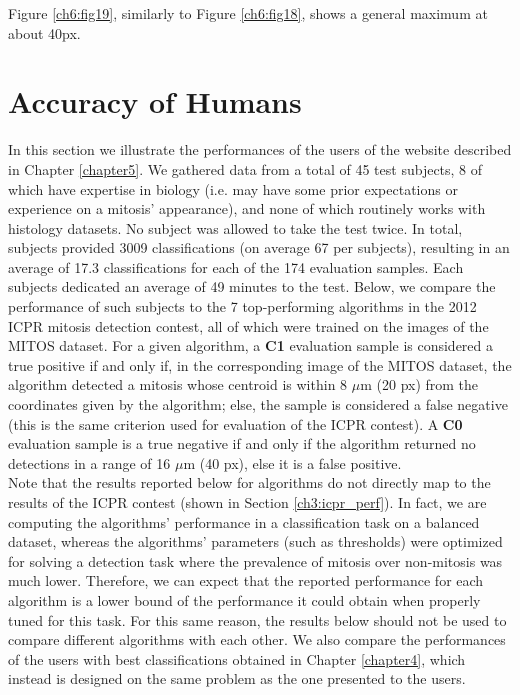 Figure \ref{ch6:fig19}, similarly to Figure \ref{ch6:fig18}, shows a general maximum at about 40px.


\vspace{0.5cm}

\clearpage

\section{Accuracy of Humans}

In this section we illustrate the performances of the users of the website described in Chapter \ref{chapter5}.
We gathered data from a total of 45 test subjects, 8 of which have expertise in biology (i.e. may have some prior expectations or experience on a mitosis’ appearance),
and none of which routinely works with histology datasets. No subject was allowed to take the test twice. In total, subjects provided 3009 classifications
(on average 67 per subjects), resulting in an average of 17.3 classifications for each of the 174 evaluation samples.
Each subjects dedicated an average of 49 minutes to the test.
Below, we compare the performance of such subjects to the 7 top-performing algorithms in the 2012 ICPR mitosis detection contest, all of which were trained
on the images of the MITOS dataset. For a given algorithm, a \textbf{C1} evaluation sample is considered a true positive if and only if, in the corresponding
image of the MITOS dataset, the algorithm detected a mitosis whose centroid is within 8 $\mu$m (20 px) from the coordinates given by the algorithm;
else, the sample is considered a false negative (this is the same criterion used for evaluation of the ICPR contest).
A \textbf{C0} evaluation sample is a true negative if and only if the algorithm
returned no detections in a range of 16 $\mu$m (40 px), else it is a false positive.\\
Note that the results reported below for algorithms do not directly map
to the results of the ICPR contest (shown in Section \ref{ch3:icpr_perf}). In fact, we are computing the algorithms’
performance in a classification task on a balanced dataset, whereas the algorithms’ parameters (such as thresholds) were optimized for solving a detection
task where the prevalence of mitosis over non-mitosis was much lower. Therefore, we can expect that the reported performance for each algorithm is a lower
bound of the performance it could obtain when properly tuned for this task.
For this same reason, the results below should not be used to compare different algorithms with each other.
We also compare the performances of the users with best classifications obtained in Chapter \ref{chapter4}, which instead is designed on the same problem
as the one presented to the users.


